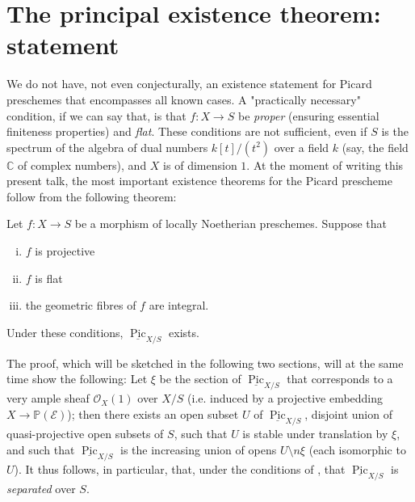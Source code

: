\section{The principal existence theorem: statement}\label{fga3.v-3}

We do not have, not even conjecturally, an existence statement for Picard preschemes that encompasses all known cases.
A "practically necessary" condition, if we can say that, is that $f\colon X\to S$ be \emph{proper} (ensuring essential finiteness properties) and \emph{flat}.
These conditions are not sufficient, even if $S$ is the spectrum of the algebra of dual numbers $k[t]/(t^2)$ over a field $k$ (say, the field $\mathbb{C}$ of complex numbers), and $X$ is of dimension $1$.
At the moment of writing this present talk, the most important existence theorems for the Picard prescheme follow from the following theorem:


\begin{theorem}\label{fga3.v-3-theorem-3.1}
    Let $f\colon X\to S$ be a morphism of locally Noetherian preschemes.
    Suppose that
    \begin{enumerate}[i.]
        \item $f$ is projective
        \item $f$ is flat
        \item the geometric fibres of $f$ are integral.
    \end{enumerate}

    Under these conditions, $\underline{\operatorname{Pic}}_{X/S}$ exists.
\end{theorem}

The proof, which will be sketched in the following two sections, will at the same time show the following:
Let $\xi$ be the section of $\underline{\operatorname{Pic}}_{X/S}$ that corresponds to a very ample sheaf $\mathcal{O}_X(1)$ over $X/S$ (i.e. induced by a projective embedding $X\to\mathbb{P}(\mathcal{E})$);
then there exists an open subset $U$ of $\underline{\operatorname{Pic}}_{X/S}$, disjoint union of quasi-projective open subsets of $S$, such that $U$ is stable under translation by $\xi$, and such that $\underline{\operatorname{Pic}}_{X/S}$ is the increasing union of opens $U\setminus n\xi$ (each isomorphic to $U$).
It thus follows, in particular, that, under the conditions of , that $\underline{\operatorname{Pic}}_{X/S}$ is \emph{separated} over $S$.

